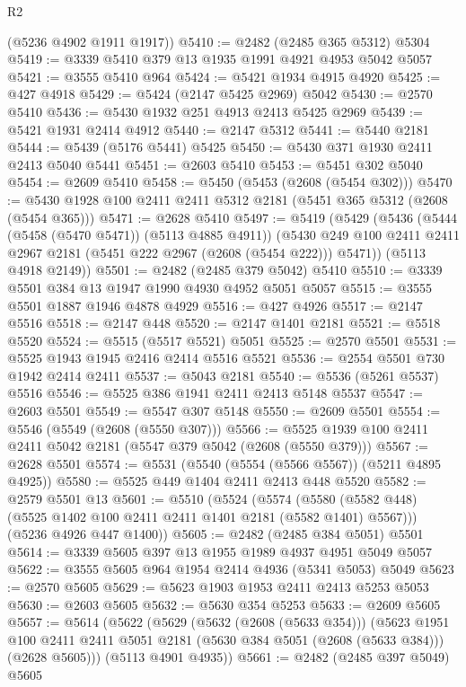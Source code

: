 \begin{lexlean}{R2}
\begin{coremodule}
      (@5236 @4902 @1911 @1917))
@5410 := @2482 (@2485 @365 @5312) @5304
@5419 := @3339 @5410 @379 @13 @1935 @1991 @4921 @4953 @5042 @5057
@5421 := @3555 @5410 @964
@5424 := @5421 @1934 @4915 @4920
@5425 := @427 @4918
@5429 := @5424 (@2147 @5425 @2969) @5042
@5430 := @2570 @5410
@5436 := @5430 @1932 @251 @4913 @2413 @5425 @2969
@5439 := @5421 @1931 @2414 @4912
@5440 := @2147 @5312
@5441 := @5440 @2181
@5444 := @5439 (@5176 @5441) @5425
@5450 := @5430 @371 @1930 @2411 @2413 @5040 @5441
@5451 := @2603 @5410
@5453 := @5451 @302 @5040
@5454 := @2609 @5410
@5458 := @5450 (@5453 (@2608 (@5454 @302)))
@5470 := @5430 @1928 @100 @2411 @2411 @5312 @2181 (@5451 @365 @5312 (@2608 (@5454 @365)))
@5471 := @2628 @5410
@5497 := @5419
    (@5429
      (@5436
        (@5444 (@5458 (@5470 @5471)) (@5113 @4885 @4911))
        (@5430 @249 @100 @2411 @2411 @2967 @2181 (@5451 @222 @2967 (@2608 (@5454 @222))) @5471))
      (@5113 @4918 @2149))
@5501 := @2482 (@2485 @379 @5042) @5410
@5510 := @3339 @5501 @384 @13 @1947 @1990 @4930 @4952 @5051 @5057
@5515 := @3555 @5501 @1887 @1946 @4878 @4929
@5516 := @427 @4926
@5517 := @2147 @5516
@5518 := @2147 @448
@5520 := @2147 @1401 @2181
@5521 := @5518 @5520
@5524 := @5515 (@5517 @5521) @5051
@5525 := @2570 @5501
@5531 := @5525 @1943 @1945 @2416 @2414 @5516 @5521
@5536 := @2554 @5501 @730 @1942 @2414 @2411
@5537 := @5043 @2181
@5540 := @5536 (@5261 @5537) @5516
@5546 := @5525 @386 @1941 @2411 @2413 @5148 @5537
@5547 := @2603 @5501
@5549 := @5547 @307 @5148
@5550 := @2609 @5501
@5554 := @5546 (@5549 (@2608 (@5550 @307)))
@5566 := @5525 @1939 @100 @2411 @2411 @5042 @2181 (@5547 @379 @5042 (@2608 (@5550 @379)))
@5567 := @2628 @5501
@5574 := @5531 (@5540 (@5554 (@5566 @5567)) (@5211 @4895 @4925))
@5580 := @5525 @449 @1404 @2411 @2413 @448 @5520
@5582 := @2579 @5501 @13
@5601 := @5510
    (@5524
      (@5574 (@5580 (@5582 @448) (@5525 @1402 @100 @2411 @2411 @1401 @2181 (@5582 @1401) @5567)))
      (@5236 @4926 @447 @1400))
@5605 := @2482 (@2485 @384 @5051) @5501
@5614 := @3339 @5605 @397 @13 @1955 @1989 @4937 @4951 @5049 @5057
@5622 := @3555 @5605 @964 @1954 @2414 @4936 (@5341 @5053) @5049
@5623 := @2570 @5605
@5629 := @5623 @1903 @1953 @2411 @2413 @5253 @5053
@5630 := @2603 @5605
@5632 := @5630 @354 @5253
@5633 := @2609 @5605
@5657 := @5614
    (@5622
      (@5629
        (@5632 (@2608 (@5633 @354)))
        (@5623
          @1951
          @100
          @2411
          @2411
          @5051
          @2181
          (@5630 @384 @5051 (@2608 (@5633 @384)))
          (@2628 @5605)))
      (@5113 @4901 @4935))
@5661 := @2482 (@2485 @397 @5049) @5605

\end{coremodule}
\end{lexlean}
